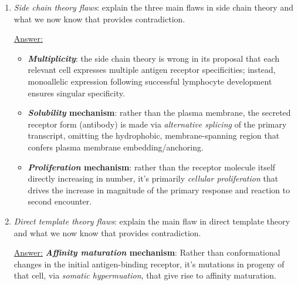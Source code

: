 \documentclass{article}
\newenvironment{QandA}{\begin{enumerate}[label=\bfseries Q\arabic*.]}
                       {\end{enumerate}}
\newenvironment{answered}{\par\normalfont\underline{Answer:}}{}
\begin{document}
\begin{QandA}
\begin{answered}
\begin{itemize}
      \item{\textbf{\textit{Heritable} change}: Pauling proposed that the conformational change was heritable, i.e. present in subsequently produced antibodies.}
    \end{itemize}
    \end{answered}
  \item{\textit{Side chain theory flaws}: explain the three main flaws in side chain theory and what we now know that provides contradiction.}
    \begin{answered}
    \begin{itemize}
      \item{\textbf{\textit{Multiplicity}}: the side chain theory is wrong in its proposal that each relevant cell expresses multiple antigen receptor specificities; instead, monoallelic expression following successful lymphocyte development ensures singular specificity.}
      \item{\textbf{\textit{Solubility} mechanism}: rather than  the plasma membrane, the secreted receptor form (antibody) is made via \textit{alternative splicing} of the primary transcript, omitting the hydrophobic, membrane-spanning region that confers plasma membrane embedding/anchoring.}
      \item{\textbf{\textit{Proliferation} mechanism}: rather than the receptor molecule itself directly increasing in number, it's primarily \textit{cellular proliferation} that drives the increase in magnitude of the primary response and reaction to second encounter.}
    \end{itemize}
    \end{answered}
  \item{\textit{Direct template theory flaws}: explain the main flaw in direct template theory and what we now know that provides contradiction.}
    \begin{answered}
    \textbf{\textit{Affinity maturation} mechanism}: Rather than conformational changes in the initial antigen-binding receptor, it's mutations in progeny of that cell, via \textit{somatic hypermuation}, that give rise to affinity maturation.
    \end{answered}
\end{QandA}
\end{document}
